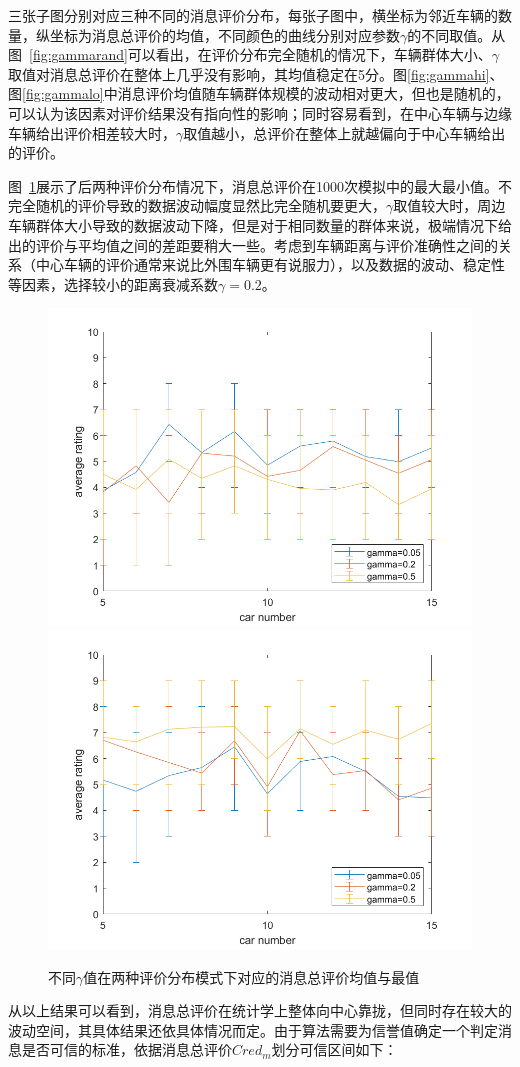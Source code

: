 三张子图分别对应三种不同的消息评价分布，每张子图中，横坐标为邻近车辆的数量，纵坐标为消息总评价的均值，不同颜色的曲线分别对应参数$\gamma$的不同取值。从图~\ref{fig:gammarand}可以看出，在评价分布完全随机的情况下，车辆群体大小、$\gamma$取值对消息总评价在整体上几乎没有影响，其均值稳定在5分。图\ref{fig:gammahi}、图\ref{fig:gammalo}中消息评价均值随车辆群体规模的波动相对更大，但也是随机的，可以认为该因素对评价结果没有指向性的影响；同时容易看到，在中心车辆与边缘车辆给出评价相差较大时，$\gamma$取值越小，总评价在整体上就越偏向于中心车辆给出的评价。

图~\ref{fig:gammaerr}展示了后两种评价分布情况下，消息总评价在1000次模拟中的最大最小值。不完全随机的评价导致的数据波动幅度显然比完全随机要更大，$\gamma$取值较大时，周边车辆群体大小导致的数据波动下降，但是对于相同数量的群体来说，极端情况下给出的评价与平均值之间的差距要稍大一些。考虑到车辆距离与评价准确性之间的关系（中心车辆的评价通常来说比外围车辆更有说服力），以及数据的波动、稳定性等因素，选择较小的距离衰减系数$\gamma=0.2$。

\begin{figure}
  \centering
    {\includegraphics[width=0.49\linewidth]{figures/gamma_centerhi_err.png}}
    {\includegraphics[width=0.49\linewidth]{figures/gamma_centerlo_err.png}}
  \caption{不同$\gamma$值在两种评价分布模式下对应的消息总评价均值与最值}
  \label{fig:gammaerr}
\end{figure}

从以上结果可以看到，消息总评价在统计学上整体向中心靠拢，但同时存在较大的波动空间，其具体结果还依具体情况而定。由于算法需要为信誉值确定一个判定消息是否可信的标准，依据消息总评价$Cred_m$划分可信区间如下：

